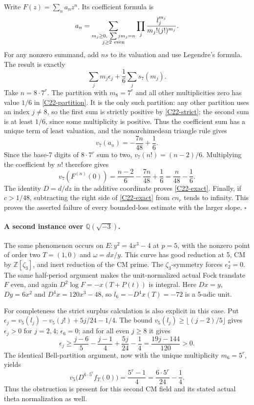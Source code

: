 \documentclass[11pt]{article}
\newcommand{\Q}{\mathbb Q}\newcommand{\C}{\mathbb C}\newcommand{\Z}{\mathbb Z}\newcommand{\R}{\mathbb R}\newcommand{\A}{\mathbb A}\newcommand{\OO}{\mathcal O}
\theoremstyle{definition}\newtheorem{definition}[theorem]{Definition}\newtheorem{remark}[theorem]{Remark}
\begin{document}
Write $F(z)=\sum_n a_nz^n$.  Its coefficient formula is
\[
 a_n=
 \sum_{\substack{m_j\geq0,\ \sum jm_j=n\\j\geq2\ {\rm even}}}
       \prod_j\frac{l_j^{m_j}}{m_j!(j!)^{m_j}}.
\]
For any nonzero summand, add $ns$ to its valuation and use
Legendre's formula.  The result is exactly
\begin{equation}\label{C22-partition}
 \sum_j m_j\epsilon_j
       +\frac16\sum_j s_7(m_j).
\end{equation}
Take $n=8\cdot7^r$.
The partition with $m_8=7^r$ and all other multiplicities
zero has value $1/6$ in \eqref{C22-partition}.
It is the only such partition: any other partition uses an
index $j\ne8$, so the first sum is strictly positive by
\eqref{C22-strict}; the second sum is at least $1/6$,
since some multiplicity is positive.
Thus the coefficient sum has a unique term of least valuation,
and the nonarchimedean triangle rule gives
\[
 v_7(a_n)=-\frac{7n}{48}+\frac16.
\]
Since the base-7 digits of $8\cdot7^r$ sum to two,
$v_7(n!)=(n-2)/6$.  Multiplying the coefficient by $n!$
therefore gives
\[
 v_7(F^{(n)}(0))=
    \frac{n-2}{6}-\frac{7n}{48}+\frac16
    =\frac{n}{48}-\frac16.
\]
The identity $D=d/dz$ in the additive coordinate proves
\eqref{C22-exact}.  Finally, if $c>1/48$, subtracting the
right side of \eqref{C22-exact} from $c n_r$ tends to
infinity.  This proves the asserted failure of every bounded-loss
estimate with the larger slope. \hfill$\square$

\paragraph{A second instance over $\Q(\sqrt{-3})$.}
The same phenomenon occurs on
$E:y^2=4x^3-4$ at $p=5$, with the nonzero point of
order two $T=(1,0)$ and $\omega=dx/y$.
This curve has good reduction at 5, CM by
$\Z[\zeta_3]$, and inert reduction of the CM prime.
The $\zeta_3$-symmetry forces $e_2^*=0$.
The same half-period argument makes the unit-normalized
actual Fock translate $F$ even, and again
$D^2\log F=-x(T+P(t))$ is integral.
Here $Dx=y$, $Dy=6x^2$ and
$D^4x=120x^3-48$, so
$l_6=-D^4x(T)=-72$ is a 5-adic unit.

For completeness the strict surplus calculation is also
explicit in this case.  Put
$\epsilon_j=v_5(l_j)-v_5(j!)+5j/24-1/4$.
The bound $v_5(l_j)\geq\lfloor(j-2)/5\rfloor$
gives $\epsilon_j>0$ for $j=2,4$;
$\epsilon_6=0$; and for all even $j\geq8$ it gives
\[
 \epsilon_j\geq
    \frac{j-6}{5}-\frac{j-1}{4}
          +\frac{5j}{24}-\frac14
       =\frac{19j-144}{120}>0.
\]
The identical Bell-partition argument, now with the
unique multiplicity $m_6=5^r$, yields
\[
 v_5\bigl(D^{6\cdot5^r}f_T(0)\bigr)
       =\frac{5^r-1}{4}
       =\frac{6\cdot5^r}{24}-\frac14.
\]
Thus the obstruction is present for this second CM field
and its stated actual theta normalization as well.
\end{document}
